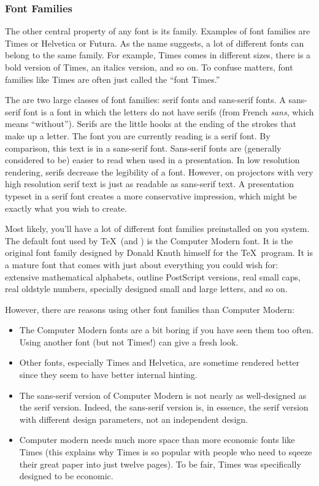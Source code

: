 \subsubsection{Font Families}

\label{section-guidelines-serif}

The other central property of any font is its family. Examples of font
families are Times or Helvetica or Futura. As the name suggests, a lot
of different fonts can belong to the same family. For example, Times
comes in different sizes, there is a bold version of Times, an
italics version, and so on. To confuse matters, font families like
Times are often just called the ``font Times.''

The are two large classes of font families: serif fonts and
sans-serif fonts. A sans-serif font is a font in
which the letters do not have serifs (from French \emph{sans}, which
means ``without''). Serifs are the little hooks at the ending of the
strokes that make up a letter. The font you are currently reading is a
serif font. \textsf{By comparison, this text is in a sans-serif font.}
Sans-serif fonts are (generally considered to be) easier to read
when used in a presentation. In low resolution rendering, serifs
decrease the legibility of a font. However, on projectors with very
high resolution serif text is just as readable as sans-serif text. A
presentation typeset in a serif font creates a more conservative
impression, which might be exactly what you wish to create. 

Most likely, you'll have a lot of different font families preinstalled
on you system. The default font used by \TeX\ (and \beamer) is the
Computer Modern font. It  is the original font family designed by Donald
Knuth himself for the \TeX\ program. It is a mature font that comes
with just about everything you could wish for: extensive mathematical
alphabets, outline PostScript versions, real small caps, real oldstyle
numbers, specially designed small and large letters, and so on.

However, there are reasons using other font families than Computer
Modern: 
\begin{itemize}
\item
  The Computer Modern fonts are a bit boring if you have seen them too
  often. Using another font (but not Times!) can give a fresh look.
\item
  Other fonts, especially Times and Helvetica, are sometime rendered
  better since they seem to have better internal hinting.
\item
  The sans-serif version of Computer Modern is not nearly as
  well-designed as the serif version. Indeed, the sans-serif version
  is, in essence, the serif version with different design parameters,
  not an independent design.
\item
  Computer modern needs much more space than more economic fonts like
  Times (this explains why Times is so popular with people who need
  to sqeeze their great paper into just twelve pages). To be fair,
  Times was specifically designed to be economic.
\end{itemize}

